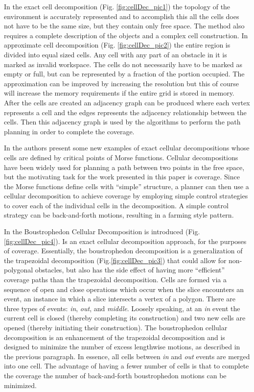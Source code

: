In the exact cell decomposition (Fig. \ref{fig:cellDec_pic1}) the topology of the environment is accurately represented and to accomplish this all the cells does not have to be the same size, but they contain only free space. The method also requires a complete description of the objects and a complex cell construction.  In approximate cell decomposition (Fig. \ref{fig:cellDec_pic2}) the entire region is divided into equal sized cells. Any cell with any part of an obstacle in it is marked as invalid workspace. The cells do not necessarily have to be marked as empty or full, but can be represented by a fraction of the portion occupied. The approximation can be improved by increasing the resolution but this of course will increase the memory requirements if the entire grid is stored in memory. After the cells are created an adjacency graph can be produced where each vertex represents a cell and the edges represents the adjacency relationship between the cells. Then this adjacency graph is used by the algorithms to perform the path planning in order to complete the coverage.

In \cite{846365} the authors present some new examples of exact cellular decompositions whose cells are defined by critical points of Morse functions. Cellular decompositions have been widely used for planning a path between two points in the free space, but the motivating task for the work presented in this paper is coverage. Since the Morse functions define cells with “simple” structure, a planner can then use a cellular decomposition to achieve coverage by employing simple control strategies to cover each of the individual cells in the decomposition. A simple
control strategy can be back-and-forth motions, resulting in a farming style pattern.



In \cite{choset} the Boustrophedon Cellular Decomposition is introduced (Fig.\ref{fig:cellDec_pic4}). Is an exact cellular decomposition approach, for the purposes of coverage. Essentially, the boustrophedon decomposition is a generalization of the trapezoidal decomposition (Fig.\ref{fig:cellDec_pic3}) that could allow for non-polygonal obstacles, but also has the side effect of having more “efficient” coverage paths than the trapezoidal decomposition. Cells are formed via a sequence of open and close operations which occur when the slice encounters an event, an instance in which a slice intersects a vertex of a polygon. There are three types of events: \emph{in}, \emph{out}, and \emph{middle}. Loosely speaking, at an \emph{in} event the current cell is closed (thereby completing its construction) and two new cells are opened (thereby initiating their construction). The boustrophedon cellular decomposition is an enhancement of the trapezoidal decomposition and is designed to minimize the number of excess lengthwise motions, as described in the previous paragraph. In essence, all cells between \emph{in} and \emph{out} events are merged into one cell. The advantage of having a fewer number of cells is that to complete the coverage the number of back-and-forth boustrophedon motions can be minimized. 

